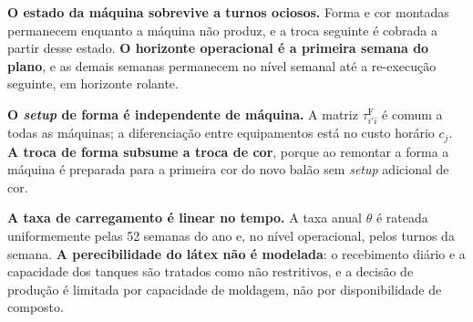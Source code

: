 \documentclass[fleqn,12pt,a4paper]{article}
\begin{document}
\textbf{O estado da máquina sobrevive a turnos ociosos.} Forma e cor montadas permanecem enquanto a máquina não produz, e a troca seguinte é cobrada a partir desse estado. \textbf{O horizonte operacional é a primeira semana do plano}, e as demais semanas permanecem no nível semanal até a re-execução seguinte, em horizonte rolante.

\textbf{O \textit{setup} de forma é independente de máquina.} A matriz $\tau^{\mathrm{F}}_{i'i}$ é comum a todas as máquinas; a diferenciação entre equipamentos está no custo horário $c_j$. \textbf{A troca de forma subsume a troca de cor}, porque ao remontar a forma a máquina é preparada para a primeira cor do novo balão sem \textit{setup} adicional de cor.

\textbf{A taxa de carregamento é linear no tempo.} A taxa anual $\theta$ é rateada uniformemente pelas 52 semanas do ano e, no nível operacional, pelos turnos da semana. \textbf{A perecibilidade do látex não é modelada}: o recebimento diário e a capacidade dos tanques são tratados como não restritivos, e a decisão de produção é limitada por capacidade de moldagem, não por disponibilidade de composto.

\newpage


   
\end{document}
